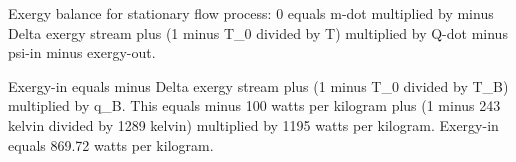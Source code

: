 Exergy balance for stationary flow process:  
0 equals m-dot multiplied by minus Delta exergy stream plus (1 minus T_0 divided by T) multiplied by Q-dot minus psi-in minus exergy-out.  

Exergy-in equals minus Delta exergy stream plus (1 minus T_0 divided by T_B) multiplied by q_B.  
This equals minus 100 watts per kilogram plus (1 minus 243 kelvin divided by 1289 kelvin) multiplied by 1195 watts per kilogram.  
Exergy-in equals 869.72 watts per kilogram.